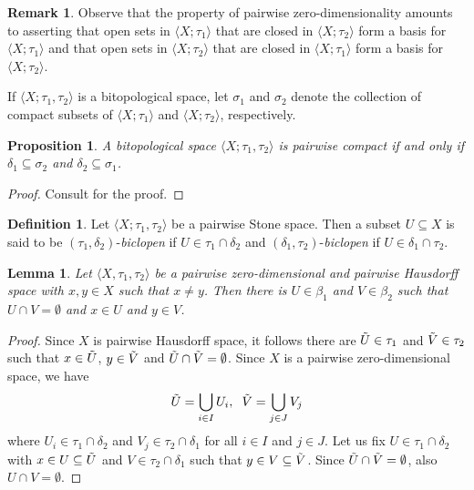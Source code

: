 \documentclass{amsart}
\theoremstyle{plain}
\newtheorem{lemma}[theorem]{Lemma}
\newtheorem{proposition}[theorem]{Proposition}
\newcommand{\tuple}[1]{\ensuremath{\langle{#1}\rangle}}
\theoremstyle{definition}
\newtheorem{definition}[theorem]{Definition}
\newtheorem{remark}[theorem]{Remark}
\begin{document}
\begin{remark}
Observe that the property of pairwise zero-dimensionality amounts to asserting that open sets in $\tuple{X;\tau_1}$ that are closed in $\tuple{X;\tau_2}$ form a basis for $\tuple{X;\tau_1}$ and that open sets in $\tuple{X;\tau_2}$ that are closed in $\tuple{X;\tau_1}$ form a basis for $\tuple{X;\tau_2}$. 
\end{remark}
If $\tuple{X;\tau_1,\tau_2}$ is a bitopological space, let $\sigma_1$ and $\sigma_2$ denote the collection of compact subsets of $\tuple{X;\tau_1}$ and $\tuple{X;\tau_2}$, respectively. 
 \begin{proposition}\label{p:compact}
    A bitopological space $\tuple{X;\tau_1,\tau_2}$ is pairwise compact if and only if $\delta_1\subseteq\sigma_2$ and $\delta_2\subseteq\sigma_1$. 
\end{proposition}
\begin{proof}
    Consult \cite[Proposition 2.9]{bezhanishvili} for the proof. 
\end{proof}
\begin{definition}
    Let $\tuple{X;\tau_1,\tau_2}$ be a pairwise Stone space. Then a subset $U\subseteq X$ is said to be $(\tau_1,\delta_2)$-\emph{biclopen} if $U\in\tau_1\cap\delta_2$ and $(\delta_1,\tau_2)$-\emph{biclopen} if $U\in\delta_1\cap\tau_2$. 
\end{definition}
\begin{lemma} \label{l:injectivity}
    Let $\langle X,\tau_1,\tau_2\rangle$ be a pairwise zero-dimensional and pairwise Hausdorff space with $x,y \in X$ such that $x \neq y$. Then there is $U \in \beta_1$ and $V \in \beta_2$ such that $U \cap V=\emptyset$ and $x \in U$ and $y \in V$.
\end{lemma}

\begin{proof}
    Since $X$ is pairwise Hausdorff space, it follows there are $\Tilde{U} \in \tau_1$ and $\Tilde{V} \in \tau_2$ such that $x \in \Tilde{U}$, $y \in \Tilde{V}$ and $\Tilde{U} \cap \Tilde{V}=\emptyset$. 
Since $X$ is a pairwise zero-dimensional space, we have
\[\Tilde{U}=\bigcup_{i \in I} U_i,\hspace{.2cm}\Tilde{V}=\bigcup_{j \in J} V_j\]
where $U_i \in \tau_1 \cap \delta_2$ and $V_j \in \tau_2 \cap \delta_1$ for all $i \in I$ and $j \in J$. Let us fix $U \in \tau_1 \cap \delta_2$ with $x \in U \subseteq \Tilde{U}$ and $V \in \tau_2 \cap \delta_1$ such that $y \in V \subseteq \Tilde{V}$. Since $\Tilde{U} \cap \Tilde{V}=\emptyset$, also $U \cap V=\emptyset$.
\end{proof}
\end{document}

